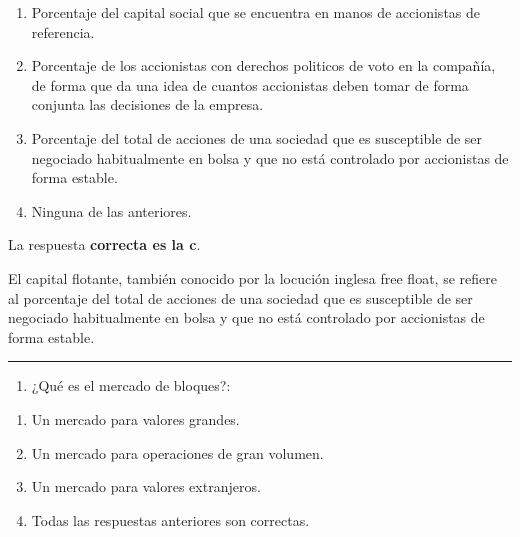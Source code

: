 \documentclass[
  letterpaper,
  DIV=11,
  numbers=noendperiod]{scrreprt}
\providecommand{\tightlist}{%
  \setlength{\itemsep}{0pt}\setlength{\parskip}{0pt}}\usepackage{longtable,booktabs,array}
\begin{document}
\begin{enumerate}
\def\labelenumi{\alph{enumi})}
\item
  Porcentaje del capital social que se encuentra en manos de accionistas
  de referencia.
\item
  Porcentaje de los accionistas con derechos politicos de voto en la
  compañía, de forma que da una idea de cuantos accionistas deben tomar
  de forma conjunta las decisiones de la empresa.
\item
  Porcentaje del total de acciones de una sociedad que es susceptible de
  ser negociado habitualmente en bolsa y que no está controlado por
  accionistas de forma estable.
\item
  Ninguna de las anteriores.
\end{enumerate}

\begin{tcolorbox}[enhanced jigsaw, left=2mm, opacityback=0, colback=white, breakable, arc=.35mm, bottomrule=.15mm, rightrule=.15mm, toprule=.15mm, leftrule=.75mm, colframe=quarto-callout-tip-color-frame]
\begin{minipage}[t]{5.5mm}
\textcolor{quarto-callout-tip-color}{\faLightbulb}
\end{minipage}%
\begin{minipage}[t]{\textwidth - 5.5mm}

La respuesta \textbf{correcta es la c}.

El capital flotante, también conocido por la locución inglesa free
float, se refiere al porcentaje del total de acciones de una sociedad
que es susceptible de ser negociado habitualmente en bolsa y que no está
controlado por accionistas de forma estable.

\end{minipage}%
\end{tcolorbox}

\begin{center}\rule{0.5\linewidth}{0.5pt}\end{center}

\begin{enumerate}
\def\labelenumi{\arabic{enumi}.}
\setcounter{enumi}{32}
\tightlist
\item
  ¿Qué es el mercado de bloques?:
\end{enumerate}

\begin{enumerate}
\def\labelenumi{\alph{enumi})}
\item
  Un mercado para valores grandes.
\item
  Un mercado para operaciones de gran volumen.
\item
  Un mercado para valores extranjeros.
\item
  Todas las respuestas anteriores son correctas.
\end{enumerate}
\end{document}
